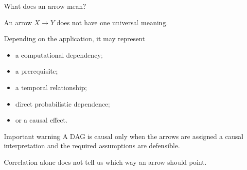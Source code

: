 \documentclass[aspectratio=43,11pt]{beamer}
\begin{document}
\begin{frame}{What does an arrow mean?}

An arrow \(X\rightarrow Y\) does not have one universal meaning.

\begin{block}{Depending on the application, it may represent}
\begin{itemize}
  \item a computational dependency;
  \item a prerequisite;
  \item a temporal relationship;
  \item direct probabilistic dependence;
  \item or a causal effect.
\end{itemize}
\end{block}

\pause

\begin{alertblock}{Important warning}
A DAG is causal only when the arrows are assigned a causal
interpretation and the required assumptions are defensible.
\end{alertblock}

\medskip

Correlation alone does not tell us which way an arrow should point.

\end{frame}
\end{document}
